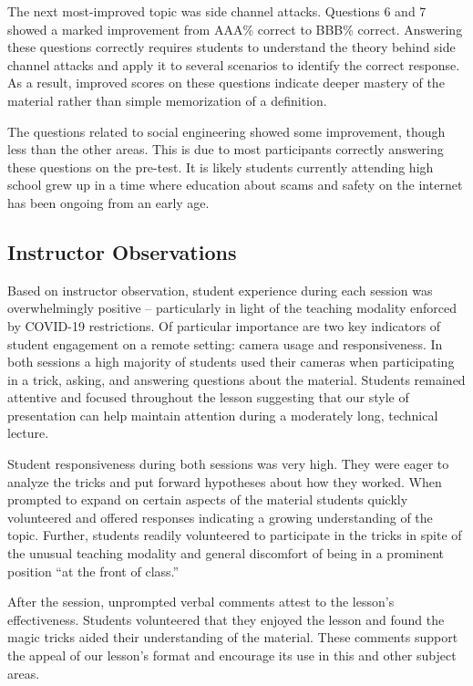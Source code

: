 The next most-improved topic was side channel attacks.  Questions 6 and 7
showed a marked improvement from AAA\% correct to BBB\% correct.  Answering
these questions correctly requires students to understand the theory
behind side
channel attacks and apply it to several scenarios to identify the correct
response.  As a result,  improved scores on these questions indicate deeper
mastery of the material rather than simple memorization of a definition.

The questions related to social engineering showed some improvement, though less
than the other areas.  This is due to most participants correctly answering
these questions on the pre-test.  It is likely students currently
attending high school grew up in a time where education about scams and
safety on the internet has been ongoing from an early age.


\subsection{Instructor Observations}

Based on instructor observation, student experience during
each session was overwhelmingly positive --
particularly in light of the teaching modality enforced by COVID-19
restrictions.
Of particular importance are two key indicators
of student engagement on a remote setting: camera usage and
responsiveness.  In both sessions a high majority of students used their
cameras when participating in a trick, asking, and answering questions
about the material.  Students remained attentive and focused throughout
 the lesson suggesting that our
style of presentation can help maintain attention during a moderately long,
technical lecture.

Student responsiveness during both sessions was very high.
They were eager to analyze the
tricks and put forward hypotheses about how they worked.
When prompted to
expand on certain aspects of the material students quickly volunteered and
offered responses indicating a growing understanding of the topic.
Further, students readily volunteered to participate in the tricks in spite
of the unusual teaching modality and general discomfort of being in a
prominent position ``at the front of class.''

After the session,
unprompted verbal comments attest to the lesson's effectiveness.
Students volunteered that they enjoyed the
lesson and found the magic tricks aided their understanding of the
material.  These comments support the appeal of our lesson's format and
encourage its use in this and other subject areas.
